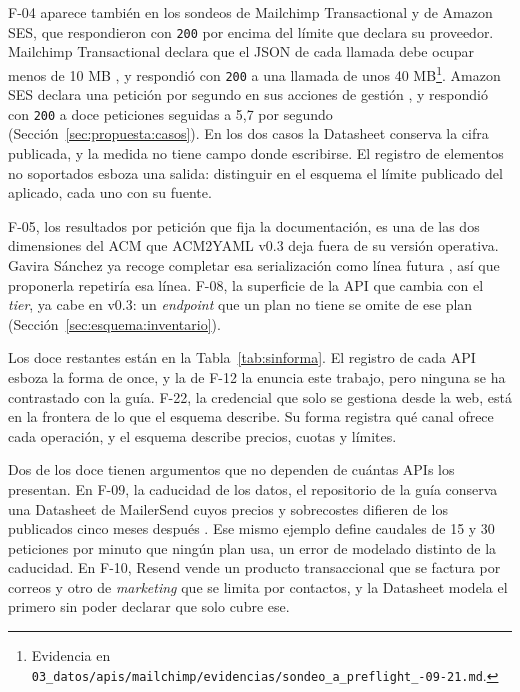F-04 aparece también en los sondeos de Mailchimp Transactional y de Amazon SES, que respondieron con \texttt{200} por encima del límite que declara su proveedor.
Mailchimp Transactional declara que el JSON de cada llamada debe ocupar menos de 10 MB \citep{mailchimpdocs}, y respondió con \texttt{200} a una llamada de unos 40 MB\footnote{Evidencia en \texttt{03\_datos/\allowbreak apis/\allowbreak mailchimp/\allowbreak evidencias/\allowbreak sondeo\_a\_preflight\_-09-21.md}.}.
Amazon SES declara una petición por segundo en sus acciones de gestión \citep{sesdocs}, y respondió con \texttt{200} a doce peticiones seguidas a 5,7 por segundo (Sección~\ref{sec:propuesta:casos}).
En los dos casos la Datasheet conserva la cifra publicada, y la medida no tiene campo donde escribirse.
El registro de elementos no soportados esboza una salida: distinguir en el esquema el límite publicado del aplicado, cada uno con su fuente.

F-05, los resultados por petición que fija la documentación, es una de las dos dimensiones del ACM que ACM2YAML v0.3 deja fuera de su versión operativa.
Gavira Sánchez ya recoge completar esa serialización como línea futura \citep{gavira2026tfm}, así que proponerla repetiría esa línea.
F-08, la superficie de la API que cambia con el \textit{tier}, ya cabe en v0.3: un \textit{endpoint} que un plan no tiene se omite de ese plan (Sección~\ref{sec:esquema:inventario}).

Los doce restantes están en la Tabla~\ref{tab:sinforma}.
El registro de cada API esboza la forma de once, y la de F-12 la enuncia este trabajo, pero ninguna se ha contrastado con la guía.
F-22, la credencial que solo se gestiona desde la web, está en la frontera de lo que el esquema describe.
Su forma registra qué canal ofrece cada operación, y el esquema describe precios, cuotas y límites.

Dos de los doce tienen argumentos que no dependen de cuántas APIs los presentan.
En F-09, la caducidad de los datos, el repositorio de la guía conserva una Datasheet de MailerSend cuyos precios y sobrecostes difieren de los publicados cinco meses después \citep{apisconsumptionmodel}.
Ese mismo ejemplo define caudales de 15 y 30 peticiones por minuto que ningún plan usa, un error de modelado distinto de la caducidad.
En F-10, Resend vende un producto transaccional que se factura por correos y otro de \textit{marketing} que se limita por contactos, y la Datasheet modela el primero sin poder declarar que solo cubre ese.

